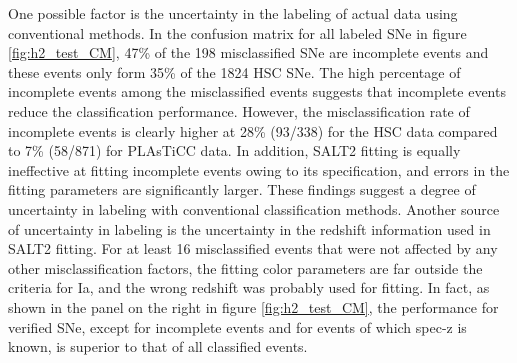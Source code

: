 \documentclass[proof]{pasj01}
\providecommand{\DIFadd}[1]{{\protect\color{blue} \sf #1}} %
\providecommand{\DIFdel}[1]{{\protect\color{red} \scriptsize #1}} %
\providecommand{\DIFaddbegin}{\protect\color{blue}} %
\providecommand{\DIFaddend}{\protect\color{black}} %
\providecommand{\DIFdelbegin}{\protect\color{red}} %
\providecommand{\DIFdelend}{\protect\color{black}} %
\newcommand{\DIFscaledelfig}{0.5}
\newlength{\DIFdelgraphicswidth} %
\newlength{\DIFdelgraphicsheight} %
\newcommand{\DIFaddincludegraphics}[2][]{{\color{blue}\fbox{\DIFOincludegraphics[#1]{#2}}}} %
\newcommand{\DIFdelincludegraphics}[2][]{%
\sbox{\DIFdelgraphicsbox}{\DIFOincludegraphics[#1]{#2}}%
\settoboxwidth{\DIFdelgraphicswidth}{\DIFdelgraphicsbox} %
\settoboxtotalheight{\DIFdelgraphicsheight}{\DIFdelgraphicsbox} %
\scalebox{\DIFscaledelfig}{%
\parbox[b]{\DIFdelgraphicswidth}{\usebox{\DIFdelgraphicsbox}\\[-\baselineskip] \rule{\DIFdelgraphicswidth}{0em}}\llap{\resizebox{\DIFdelgraphicswidth}{\DIFdelgraphicsheight}{%
\setlength{\unitlength}{\DIFdelgraphicswidth}%
\begin{picture}(1,1)%
\thicklines\linethickness{2pt} %
{\color[rgb]{1,0,0}\put(0,0){\framebox(1,1){}}}%
{\color[rgb]{1,0,0}\put(0,0){\line( 1,1){1}}}%
{\color[rgb]{1,0,0}\put(0,1){\line(1,-1){1}}}%
\end{picture}%
}\hspace*{3pt}}} %
} %
\DeclareRobustCommand{\DIFaddbegin}{\DIFOaddbegin \let\includegraphics\DIFaddincludegraphics} %
\DeclareRobustCommand{\DIFaddend}{\DIFOaddend \let\includegraphics\DIFOincludegraphics} %
\DeclareRobustCommand{\DIFdelbegin}{\DIFOdelbegin \let\includegraphics\DIFdelincludegraphics} %
\DeclareRobustCommand{\DIFdelend}{\DIFOaddend \let\includegraphics\DIFOincludegraphics} %
\begin{document}
One possible factor is the uncertainty in the labeling of actual data using conventional methods.
In the confusion matrix for all labeled SNe in figure \ref{fig:h2_test_CM}, 47\% of the 198 misclassified SNe are incomplete events and these events only form 35\% of the 1824 HSC SNe.
The high percentage of incomplete events among the misclassified events suggests that incomplete events reduce the classification performance.
However, the misclassification rate of incomplete events is clearly higher at 28\% (93/338) for the HSC data compared to 7\% (58/871) for PLAsTiCC data.
In addition, SALT2 fitting is equally ineffective at fitting incomplete events owing to its specification, and errors in the fitting parameters are significantly larger.
These findings suggest a degree of uncertainty in labeling with conventional classification methods.
Another source of uncertainty in labeling is the uncertainty in the redshift information used in SALT2 fitting.
For at least 16 misclassified events that were not affected by any other misclassification factors, the fitting color parameters are far outside the criteria for Ia, and the wrong redshift was probably used for fitting.
In fact, as shown in the panel on the right in figure \ref{fig:h2_test_CM}, the performance for \DIFdelbegin \DIFdel{light curve }\DIFdelend \DIFaddbegin \DIFadd{light-curve }\DIFaddend verified SNe, except for incomplete events and for events of which spec-z is \DIFdelbegin \DIFdel{not }\DIFdelend known, is superior to that of all classified events.
\end{document}
